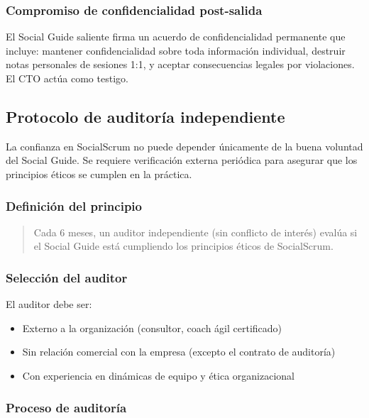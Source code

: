 \subsubsection{Compromiso de confidencialidad post-salida}

El Social Guide saliente firma un acuerdo de confidencialidad permanente que incluye: mantener confidencialidad sobre toda información individual, destruir notas personales de sesiones 1:1, y aceptar consecuencias legales por violaciones. El CTO actúa como testigo.

\subsection{Protocolo de auditoría independiente}

La confianza en SocialScrum no puede depender únicamente de la buena voluntad del Social Guide. Se requiere verificación externa periódica para asegurar que los principios éticos se cumplen en la práctica.

\subsubsection{Definición del principio}

\begin{quote}
    Cada 6 meses, un auditor independiente (sin conflicto de interés) evalúa si el Social Guide está cumpliendo los principios éticos de SocialScrum.
\end{quote}

\subsubsection{Selección del auditor}

El auditor debe ser:
\begin{itemize}
    \item Externo a la organización (consultor, coach ágil certificado)
    \item Sin relación comercial con la empresa (excepto el contrato de auditoría)
    \item Con experiencia en dinámicas de equipo y ética organizacional
\end{itemize}

\subsubsection{Proceso de auditoría}


